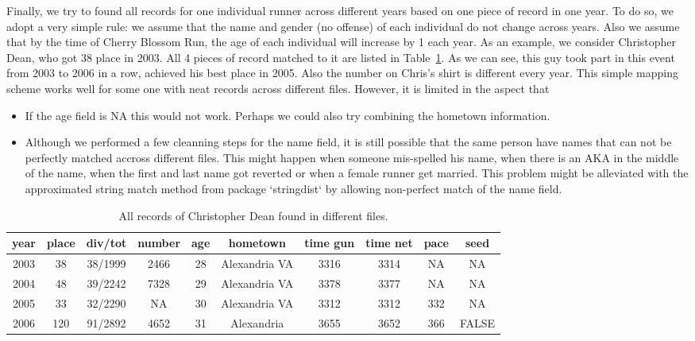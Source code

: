 \documentclass[twocolumn]{article}
\begin{document}
Finally, we try to found all records for one individual runner across different
years based on one piece of record in one year. To do so, we adopt a very
simple rule: we assume that the name and gender (no offense) of each individual
do not change across years. Also we assume that by the time of Cherry Blossom
Run, the age of each individual will increase by 1 each year. As an example, we
consider Christopher Dean, who got 38 place in 2003.
All 4 pieces of record matched to it are listed in Table~\ref{tab:match}. As we
can see, this guy took part in this event from 2003 to 2006 in a row, achieved
his best place in 2005. Also the number on Chris's shirt is different every
year. This simple mapping scheme works well for some one with neat records
across different files. However, it is limited in the aspect that
\begin{itemize}
    \item If the age field is NA this would not work. Perhaps we could also try
    combining the hometown information.
    \item Although we performed a few cleanning steps for the name field, it is
    still possible that the same person have names that can not be perfectly
    matched accross different files. This might happen when someone mis-spelled
    his name, when there is an AKA in the middle of the name, when the first and
    last name got reverted or when a female runner get married. This problem
    might be alleviated with the approximated string match method from
    package `stringdist` by allowing non-perfect match of
    the name field.
\end{itemize}

\begin{table}[!h]
    \renewcommand{\arraystretch}{1.3}
    \caption{All records of Christopher Dean found in different files.}
    \label{tab:match}
    \centering
    \begin{tabular}{c|ccccccccc}
        \hline
        year & place & div/tot & number & age & hometown & time gun &
        time net & pace & seed \\
        \hline
        2003 & 38 & 38/1999  & 2466 & 28 & Alexandria VA &
        3316 & 3314 & NA & NA\\
        2004 & 48 & 39/2242 & 7328 & 29 & Alexandria VA & 3378 & 3377 & NA & NA
        \\
        2005 & 33 & 32/2290 & NA & 30 & Alexandria VA & 3312 & 3312 & 332 & NA
        \\
        2006 & 120 & 91/2892 & 4652 & 31 & Alexandria & 3655 & 3652 & 366 &
        FALSE \\
        \hline
    \end{tabular}
\end{table}

%
%

\end{document}

